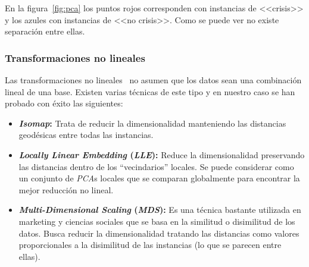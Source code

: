 En la figura~\ref{fig:pca} los puntos rojos corresponden con instancias de <<crisis>> y los azules con instancias de <<no crisis>>. Como se puede ver no existe separación entre ellas. 

\subsubsection{Transformaciones no lineales}

Las transformaciones no lineales~\cite{manifold} no asumen que los datos sean una combinación lineal de una base. Existen varias técnicas de este tipo y en nuestro caso se han probado con éxito las siguientes: 

\begin{itemize}
	\item \textbf{\textit{Isomap}:} Trata de reducir la dimensionalidad manteniendo las distancias geodésicas entre todas las instancias.
	\item \textbf{\textit{Locally Linear Embedding} (\textit{LLE}):} Reduce la dimensionalidad preservando las distancias dentro de los ``vecindarios'' locales. Se puede considerar como un conjunto de \textit{PCA}s locales que se comparan globalmente para encontrar la mejor reducción no lineal. 
	\item \textbf{\textit{Multi-Dimensional Scaling} (\textit{MDS}):} Es una técnica bastante utilizada en marketing y ciencias sociales que se basa en la similitud o disimilitud de los datos. Busca reducir la dimensionalidad tratando las distancias como valores proporcionales a la disimilitud de las instancias (lo que se parecen entre ellas).   
\end{itemize}

